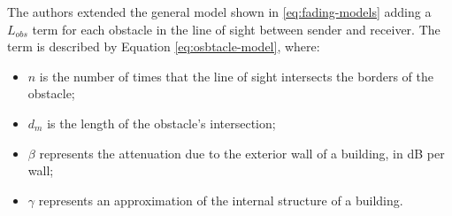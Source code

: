 		The authors extended the general model shown in \ref{eq:fading-models} adding a $L_{obs}$ term for each obstacle in the line of sight between sender and receiver. The term is described by Equation \ref{eq:osbtacle-model}, where:
		\begin{itemize}
			\item $n$ is the number of times that the line of sight intersects the borders of the obstacle;
			\item $d_m$ is the length of the obstacle's intersection;
			\item $\beta$ represents the attenuation due to the exterior wall of a building, in dB per wall;
			\item $\gamma$ represents an approximation of the internal structure of a building.
		\end{itemize}
		
